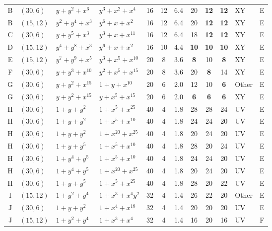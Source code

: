 \begin{table}[t]
\begin{tabular*}{\textwidth}{@{\extracolsep{\fill}}clllcccccclc}
B & $(30,6)$ & $y{+}y^{2}{+}x^{6}$ & $y^{3}{+}x^{2}{+}x^{4}$ & 16 & 12 & 6.4 & 20 & \textbf{12} & \textbf{12} & XY & E \\
B & $(15,12)$ & $y^{2}{+}y^{4}{+}x^{3}$ & $y^{6}{+}x{+}x^{2}$ & 16 & 12 & 6.4 & 20 & \textbf{12} & \textbf{12} & XY & E \\
C & $(30,6)$ & $y{+}y^{5}{+}x^{3}$ & $y^{3}{+}x{+}x^{11}$ & 16 & 12 & 6.4 & 18 & \textbf{12} & \textbf{12} & XY & E \\
D & $(15,12)$ & $y^{4}{+}y^{8}{+}x^{3}$ & $y^{6}{+}x{+}x^{2}$ & 16 & 10 & 4.4 & \textbf{10} & \textbf{10} & \textbf{10} & XY & E \\
E & $(15,12)$ & $y^{7}{+}y^{9}{+}x^{5}$ & $y^{3}{+}x^{5}{+}x^{10}$ & 20 & 8 & 3.6 & \textbf{8} & 10 & \textbf{8} & XY & E \\
F & $(30,6)$ & $y{+}y^{3}{+}x^{10}$ & $y^{2}{+}x^{5}{+}x^{15}$ & 20 & 8 & 3.6 & 20 & \textbf{8} & 14 & XY & E \\
G & $(30,6)$ & $y{+}y^{2}{+}x^{15}$ & $1{+}y{+}x^{10}$ & 20 & 6 & 2.0 & 12 & 10 & \textbf{6} & Other & E \\
G & $(30,6)$ & $y{+}y^{2}{+}x^{15}$ & $y{+}x^{5}{+}x^{15}$ & 20 & 6 & 2.0 & \textbf{6} & \textbf{6} & \textbf{6} & XY & E \\
H & $(30,6)$ & $1{+}y{+}y^{2}$ & $1{+}x^{5}{+}x^{25}$ & 40 & 4 & 1.8 & 28 & 28 & 24 & UV & E \\
H & $(30,6)$ & $1{+}y{+}y^{2}$ & $1{+}x^{5}{+}x^{10}$ & 40 & 4 & 1.8 & 24 & 24 & 20 & UV & E \\
H & $(30,6)$ & $1{+}y{+}y^{2}$ & $1{+}x^{20}{+}x^{25}$ & 40 & 4 & 1.8 & 20 & 24 & 20 & UV & E \\
H & $(30,6)$ & $1{+}y{+}y^{5}$ & $1{+}x^{5}{+}x^{10}$ & 40 & 4 & 1.8 & 28 & 20 & 24 & UV & E \\
H & $(30,6)$ & $1{+}y^{4}{+}y^{5}$ & $1{+}x^{5}{+}x^{10}$ & 40 & 4 & 1.8 & 24 & 24 & 20 & UV & E \\
H & $(30,6)$ & $1{+}y^{4}{+}y^{5}$ & $1{+}x^{20}{+}x^{25}$ & 40 & 4 & 1.8 & 20 & 24 & 20 & UV & E \\
H & $(30,6)$ & $1{+}y{+}y^{5}$ & $1{+}x^{5}{+}x^{25}$ & 40 & 4 & 1.8 & 28 & 20 & 22 & UV & E \\
I & $(15,12)$ & $1{+}y^{2}{+}y^{4}$ & $1{+}x^{3}{+}x^{4}y^{2}$ & 32 & 4 & 1.4 & 26 & 22 & 20 & Other & E \\
J & $(30,6)$ & $1{+}y{+}y^{2}$ & $1{+}x^{4}{+}x^{18}$ & 32 & 4 & 1.4 & 20 & 20 & 20 & UV & E \\
J & $(15,12)$ & $1{+}y^{2}{+}y^{4}$ & $1{+}x^{3}{+}x^{4}$ & 32 & 4 & 1.4 & 16 & 20 & 16 & UV & F \\

\end{tabular*}
\end{table}

